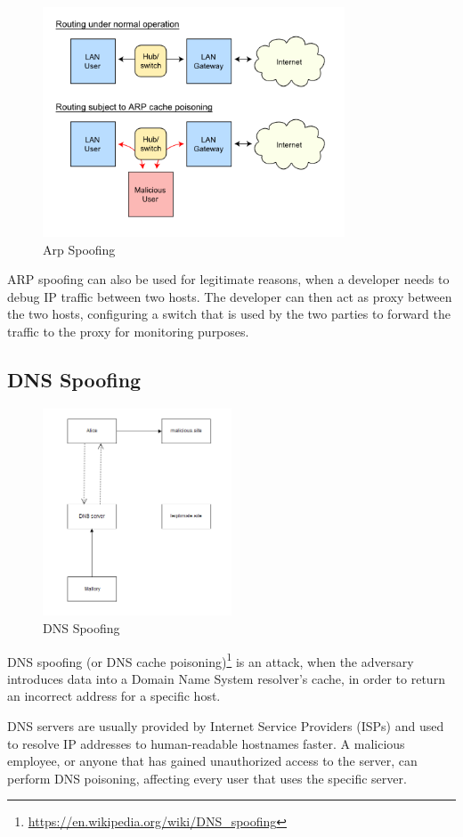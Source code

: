 \begin{figure}[H] \caption{Arp Spoofing} \centering
\includegraphics[width=0.8\textwidth]{diagrams/arp_spoofing.png}\end{figure}

ARP spoofing can also be used for legitimate reasons, when a developer needs to
debug IP traffic between two hosts. The developer can then act as proxy between
the two hosts, configuring a switch that is used by the two parties to forward
the traffic to the proxy for monitoring purposes.

\subsection{DNS Spoofing}

\begin{figure}[H] \caption{DNS Spoofing} \centering
\includegraphics[width=0.5\textwidth]{diagrams/dns_spoofing.png}\end{figure}

DNS spoofing (or DNS cache
poisoning)\footnote{\url{https://en.wikipedia.org/wiki/DNS_spoofing}} is an
attack, when the adversary introduces data into a Domain Name System resolver's
cache, in order to return an incorrect address for a specific host.

DNS servers are usually provided by Internet Service Providers (ISPs) and used
to resolve IP addresses to human-readable hostnames faster. A malicious
employee, or anyone that has gained unauthorized access to the server, can
perform DNS poisoning, affecting every user that uses the specific server.
